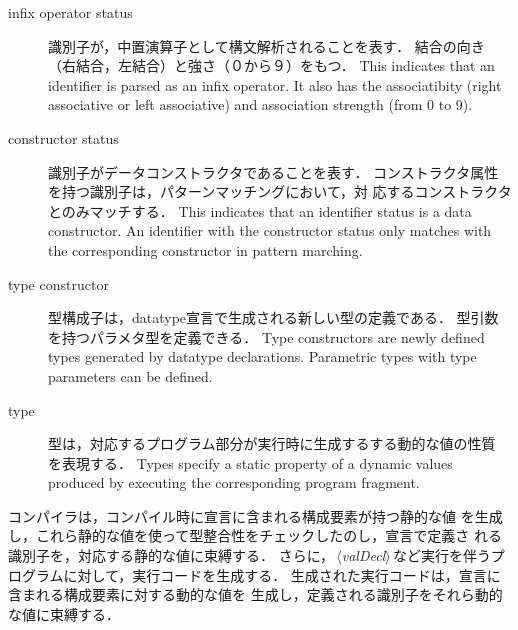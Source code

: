 \documentclass{jbook}
\newcommand{\txt}[2]{#2}
\newcommand{\nonterm}[1]{\mbox{$\,\langle$}{\it #1}\mbox{$\rangle\,$}}
\begin{document}
\begin{description}
\item[\txt{中置演算子属性}{infix operator status}]
\ifjp%
	識別子が，中置演算子として構文解析されることを表す．
	結合の向き（右結合，左結合）と強さ（０から９）をもつ．
\else%
	This indicates that an identifier is parsed as an infix
operator.
	It also has the associatibity (right associative or left associative)
and association strength (from 0 to 9).
\fi%

\item[\txt{コンストラクタ属性}{constructor status}]
\ifjp%
	識別子がデータコンストラクタであることを表す．
	コンストラクタ属性を持つ識別子は，パターンマッチングにおいて，対
応するコンストラクタとのみマッチする．
\else%
	This indicates that an identifier status is a data constructor.
	An identifier with the constructor status only matches with
the corresponding constructor in pattern marching.
\fi%

\item[\txt{型構成子}{type constructor}]
\ifjp%
	型構成子は，datatype宣言で生成される新しい型の定義である．
	型引数を持つパラメタ型を定義できる．
\else%
	Type constructors are newly defined types generated by datatype
declarations.
	Parametric types with type parameters can be defined.
\fi%

\item[\txt{型}{type}]
\ifjp%
	型は，対応するプログラム部分が実行時に生成するする動的な値の性質
を表現する．
\else%
	Types specify a static property of a dynamic values produced by
executing the corresponding program fragment.
\fi%
\end{description}

\ifjp%
	コンパイラは，コンパイル時に宣言に含まれる構成要素が持つ静的な値
を生成し，これら静的な値を使って型整合性をチェックしたのし，宣言で定義さ
れる識別子を，対応する静的な値に束縛する．
	さらに，\nonterm{valDecl}など実行を伴うプログラムに対して，実行コードを生成する．
	生成された実行コードは，宣言に含まれる構成要素に対する動的な値を
生成し，定義される識別子をそれら動的な値に束縛する．
\end{document}
